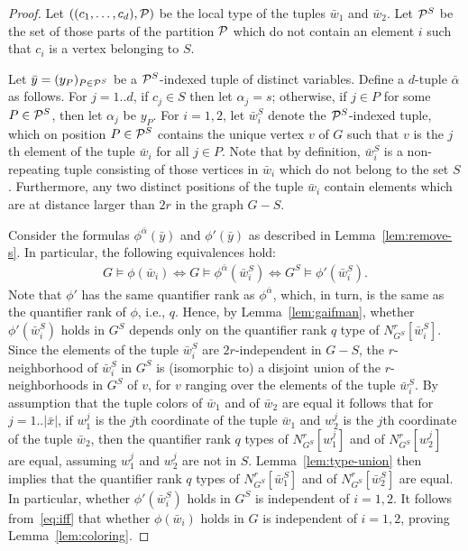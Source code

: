 \begin{proof}
 Let $((c_1,\ldots,c_d),\cal P)$ be the local type of the tuples $\bar w_1$ and $\bar w_2$.
  Let ${\cal P}^S$ be the set of those parts of the partition $\cal P$  which do not contain an element $i$ such that $c_i$ is a vertex belonging to $S$.  
  
  Let $\bar y=(y_P)_{P\in{\cal P}^S}$ be a ${\cal P}^S$-indexed tuple of distinct variables.
 	Define a $d$-tuple $\bar \alpha$ as follows. For $j=1..d$, if 
	$c_j\in S$ then let $\alpha_j=s$;
	otherwise, if $j\in P$ for some $P\in {\cal P}^S$, 
	then let $\alpha_j$
be $y_P$.
	For $i=1,2$, let $\bar w_i^S$ denote the ${\cal P}^S$-indexed tuple, which on position  $P\in {\cal P}^S$
	contains the unique vertex $v$ of $G$ such that $v$ is the $j$th element of the tuple $\bar w_i$
	for all  $j\in P$. Note that by definition, $\bar w_i^S$ is a non-repeating tuple consisting of those vertices in $\bar w_i$ which do not belong to the set $S$. Furthermore, 
	any two distinct positions of the tuple $\bar w_i$
	contain elements which are at distance larger than $2r$ in the graph $G-S$.
		
	
	Consider the formulas $\phi^{\bar \alpha}(\bar y)$ and $\phi'(\bar y)$ as described in Lemma~\ref{lem:remove-s}.
	In particular, the following equivalences hold:
	\begin{align}\label{eq:iff}
	G\models\phi(\bar w_i)\iff G\models\phi^{\bar\alpha}(\bar w_i^S)\iff G^S\models\phi'(\bar w_i^S).		
	\end{align}
		Note that $\phi'$ has the same quantifier rank as $\phi^{\bar \alpha}$, which, in turn, is the same as the quantifier rank of $\phi$, i.e., $q$. Hence, by Lemma~\ref{lem:gaifman}, whether $\phi'(\bar w_i^S)$ holds in $G^S$ depends only on the quantifier rank $q$ type of $N^r_{G^S}[\bar w_i^S]$. 
Since the  elements of the tuple $\bar w_i^S$ are $2r$-independent in $G-S$, the $r$-neighborhood of $\bar w_i^S$ in $G^S$  
is (isomorphic to) a disjoint union of the $r$-neighborhoods in $G^S$
of $v$, for $v$ ranging over the elements of the tuple $\bar w_i^S$.
By assumption that the tuple colors of $\bar w_1$ and of $\bar w_2$ are equal it follows that for $j=1..|\bar x|$,
if $w^j_1$ is the $j$th coordinate of the tuple $\bar w_1$
and $w^j_2$ is the $j$th coordinate of the tuple $\bar w_2$,
then the quantifier rank $q$ types of $N^r_{G^S}[w^j_1]$ and 
of $N^r_{G^S}[w^j_2]$ are equal, assuming $w^j_1$ and $w^j_2$
are not in $S$. Lemma~\ref{lem:type-union} then implies 
that the quantifier rank $q$ types of  $N^r_{G^S}[\bar w_1^S]$ and of $N^r_{G^S}[\bar w_2^S]$ are equal. 
In particular, whether $\phi'(\bar w_i^S)$ holds in $G^S$ is independent of $i=1,2$.
It follows from~\eqref{eq:iff} that whether $\phi(\bar w_i)$ holds
in $G$ is independent of $i=1,2$, proving Lemma~\ref{lem:coloring}.
\end{proof}



